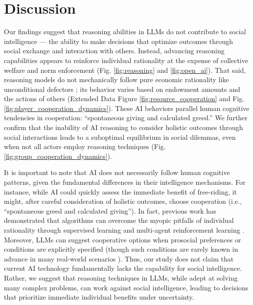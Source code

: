 \section*{Discussion}
Our findings suggest that reasoning abilities in LLMs do not contribute to social intelligence --- the ability to make decisions that optimize outcomes through social exchange and interaction with others.
Instead, advancing reasoning capabilities appears to reinforce individual rationality at the expense of collective welfare and norm enforcement (Fig. \ref{fig:reasoning} and \ref{fig:open_ai}). 
That said, reasoning models do not mechanically follow pure economic rationality like unconditional defectors \cite{shirado2013quality}; its behavior varies based on endowment amounts and the actions of others (Extended Data Figure \ref{fig:resource_cooperation} and Fig. \ref{fig:player_cooperation_dynamics}).
These AI behaviors parallel human cognitive tendencies in cooperation: ``spontaneous giving and calculated greed.'' \cite{rand2012spontaneous}
We further confirm that the inability of AI reasoning to consider holistic outcomes through social interactions leads to a suboptimal equilibrium in social dilemmas, even when not all actors employ reasoning techniques (Fig. \ref{fig:group_cooperation_dynamics}).

It is important to note that AI does not necessarily follow human cognitive patterns, given the fundamental differences in their intelligence mechanisms.
For instance, while AI could quickly assess the immediate benefit of free-riding, it might, after careful consideration of holistic outcomes, choose cooperation (i.e., ``spontaneous greed and calculated giving'').
In fact, previous work has demonstrated that algorithms can overcome the myopic pitfalls of individual rationality through supervised learning and multi-agent reinforcement learning \cite{crandall2018cooperating, de2006learning, leibo2017multi}.
Moreover, LLMs can suggest cooperative options when prosocial preferences or conditions are explicitly specified \cite{piatti2025cooperate, phelps2023investigating} (though such conditions are rarely known in advance in many real-world scenarios \cite{simon1955behavioral}).
Thus, our study does not claim that current AI technology fundamentally lacks the capability for social intelligence.
Rather, we suggest that reasoning techniques in LLMs, while adept at solving many complex problems, can work against social intelligence, leading to decisions that prioritize immediate individual benefits under uncertainty.

